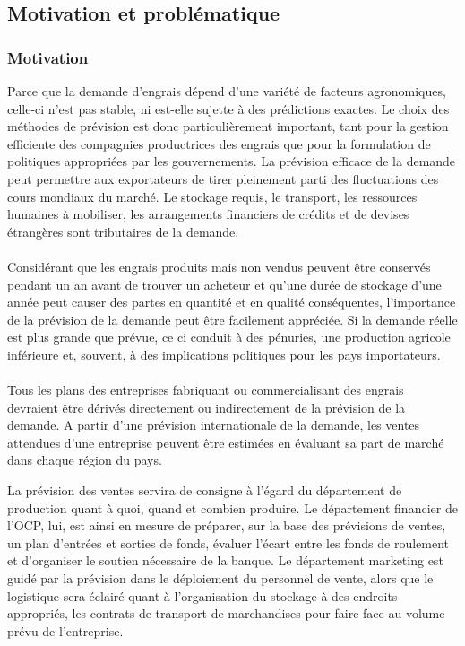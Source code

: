 	\subsection{Motivation et problématique}
	\subsubsection{Motivation}
	Parce que la demande d'engrais dépend d'une variété de facteurs agronomiques, celle-ci n’est pas stable, ni est-elle sujette à des prédictions exactes. Le choix des méthodes de prévision est donc particulièrement important, tant pour la gestion efficiente des compagnies productrices des engrais que pour la formulation de politiques appropriées par les gouvernements.
	La prévision efficace de la demande peut permettre aux exportateurs de tirer pleinement parti des fluctuations des cours mondiaux du marché. Le stockage requis, le transport, les ressources humaines à mobiliser, les arrangements financiers de crédits et de devises étrangères sont tributaires de la demande.
	\paragraph{}
	Considérant que les engrais produits mais non vendus peuvent être conservés pendant un an avant de trouver un acheteur et qu'une durée de stockage d'une année peut causer des partes en quantité et en qualité conséquentes, l'importance de la prévision de la demande peut être facilement appréciée. Si la demande réelle est plus grande que prévue, ce ci conduit à des pénuries, une production agricole inférieure et, souvent, à des implications politiques pour les pays importateurs.
	\paragraph{}
	Tous les plans des entreprises fabriquant ou commercialisant des engrais devraient être dérivés directement ou indirectement de la prévision de la demande. A partir d'une prévision internationale de la demande, les ventes attendues d'une entreprise peuvent être estimées en évaluant sa part de marché dans chaque région du pays.
	\par
	La prévision des ventes servira de consigne à l’égard du département de production quant à quoi, quand et combien produire. Le département financier de l'OCP, lui, est ainsi en mesure de préparer, sur la base des prévisions de ventes, un plan d'entrées et sorties de fonds, évaluer l'écart entre les fonds de roulement et d'organiser le soutien nécessaire de la banque. Le département marketing est guidé par la prévision dans le déploiement du personnel de vente, alors que le logistique sera éclairé quant à l’organisation du stockage à des endroits appropriés, les contrats de transport de marchandises pour faire face au volume prévu de l'entreprise.
